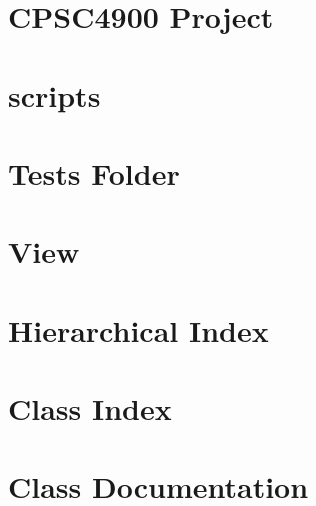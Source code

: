 \documentclass[twoside]{book}
\begin{document}
\chapter{C\-P\-S\-C4900 Project}
\label{md_readme}
\hypertarget{md_readme}{}

\chapter{scripts}
\label{md_scripts_readme}
\hypertarget{md_scripts_readme}{}

\chapter{Tests Folder}
\label{md_tests_readme}
\hypertarget{md_tests_readme}{}

\chapter{View}
\label{md_view_readme}
\hypertarget{md_view_readme}{}

\chapter{Hierarchical Index}

\chapter{Class Index}

\chapter{Class Documentation}



\newpage
{}
{}
\printindex
\end{document}
